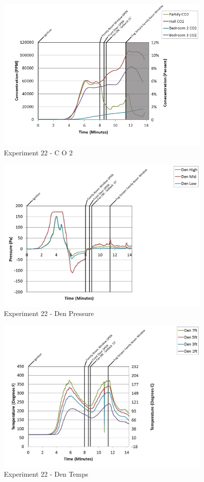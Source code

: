 \documentclass{article}
\begin{document}
\begin{appendices}
\begin{figure}[h!]
	\centering
	\includegraphics[height=3.05in]{0_Images/Results_Charts/Exp_22_Charts/CO2.png}
	\caption{Experiment 22 - C O 2}
\end{figure}

\clearpage

\begin{figure}[h!]
	\centering
	\includegraphics[height=3.05in]{0_Images/Results_Charts/Exp_22_Charts/DenPressure.png}
	\caption{Experiment 22 - Den Pressure}
\end{figure}


\begin{figure}[h!]
	\centering
	\includegraphics[height=3.05in]{0_Images/Results_Charts/Exp_22_Charts/DenTemps.png}
	\caption{Experiment 22 - Den Temps}
\end{figure}


\end{appendices}
\end{document}
